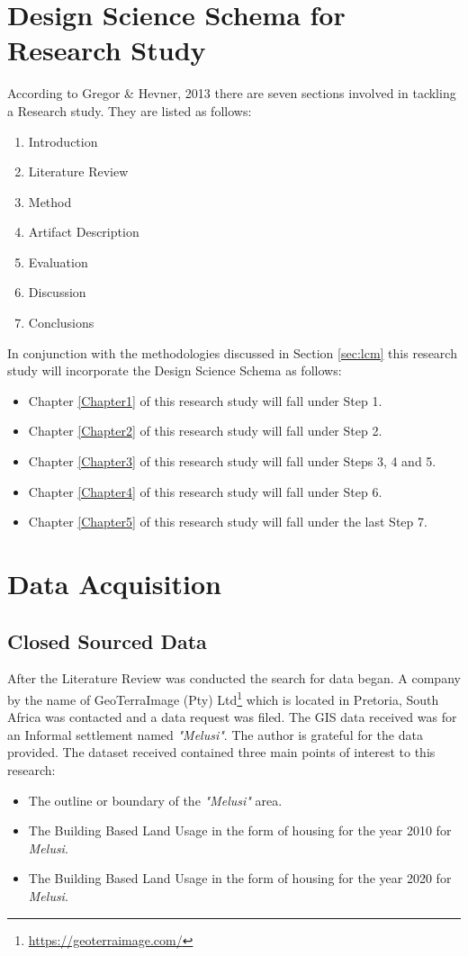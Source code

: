 \section{Design Science Schema for Research Study}
According to Gregor \& Hevner, 2013 there are seven sections involved in tackling a Research study. They are listed as follows:\cite{dssteps}
\begin{enumerate}
\item Introduction
\item Literature Review
\item Method
\item Artifact Description
\item Evaluation
\item Discussion
\item Conclusions
\end{enumerate}
In conjunction with the methodologies discussed in Section \ref{sec:lcm} this research study will incorporate the Design Science Schema as follows:
\begin{itemize}
\item Chapter \ref{Chapter1} of this research study will fall under Step 1.
\item Chapter \ref{Chapter2} of this research study will fall under Step 2.
\item Chapter \ref{Chapter3} of this research study will fall under Steps 3, 4 and 5.
\item Chapter \ref{Chapter4} of this research study will fall under Step 6.
\item Chapter \ref{Chapter5} of this research study will fall under the last Step 7.
\end{itemize}
\section{Data Acquisition}
\subsection{Closed Sourced Data}
After the Literature Review was conducted the search for data began. A company by the name of GeoTerraImage (Pty) Ltd\footnote{\url{https://geoterraimage.com/}} which is located in Pretoria, South Africa was contacted and a data request was filed. The GIS data received was for an Informal settlement named \textit{"Melusi"}. The author is grateful for the data provided. The dataset received contained three main points of interest to this research:
\begin{itemize}
\item The outline or boundary of the \textit{"Melusi"} area.
\item The Building Based Land Usage in the form of housing for the year 2010 for \textit{Melusi}.
\item The Building Based Land Usage in the form of housing for the year 2020 for \textit{Melusi}.
\end{itemize}
